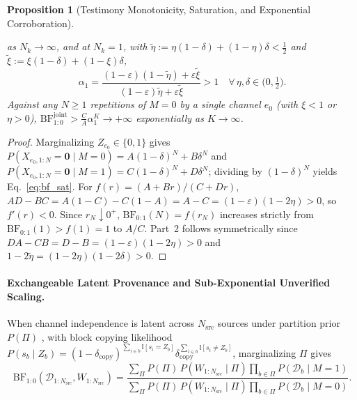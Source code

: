 \documentclass[11pt,a4paper]{article}
\newtheorem{proposition}{Proposition}
\theoremstyle{definition}
\theoremstyle{remark}
\newcommand{\BF}{\mathrm{BF}}
\begin{document}
\begin{proposition}[Testimony Monotonicity, Saturation, and Exponential Corroboration]
\begin{enumerate}[leftmargin=1.8em]
\begin{equation}
    \label{eq:alpha_inf}
  \end{equation}
  as $N_k \to \infty$, and at $N_k = 1$, with $\tilde{\eta} := \eta(1-\delta) + (1-\eta)\delta < \tfrac{1}{2}$ and $\tilde{\xi} := \xi(1-\delta) + (1-\xi)\delta$,
  \begin{equation}
    \alpha_1 = \frac{(1-\varepsilon)(1-\tilde{\eta}) + \varepsilon\tilde{\xi}}{(1-\varepsilon)\tilde{\eta} + \varepsilon\tilde{\xi}} > 1 \quad \forall\,\eta, \delta \in \bigl(0, \tfrac{1}{2}\bigr).
    \label{eq:alpha_one}
  \end{equation}
  Against any $N \ge 1$ repetitions of $M=0$ by a single channel $e_0$ (with $\xi < 1$ or $\eta > 0$), $\BF_{1:0}^{\mathrm{joint}} > \frac{C}{A} \alpha_1^K \to +\infty$ exponentially as $K \to \infty$.
\end{enumerate}
\end{proposition}

\begin{proof}
Marginalizing $Z_{e_0} \in \{0, 1\}$ gives $P(X_{e_0,1:N} = \mathbf{0} \mid M=0) = A(1-\delta)^N + B\delta^N$ and $P(X_{e_0,1:N} = \mathbf{0} \mid M=1) = C(1-\delta)^N + D\delta^N$; dividing by $(1-\delta)^N$ yields Eq.~\eqref{eq:bf_sat}. For $f(r) = (A + Br)/(C + Dr)$, $AD - BC = A(1-C) - C(1-A) = A - C = (1-\varepsilon)(1 - 2\eta) > 0$, so $f'(r) < 0$. Since $r_N \downarrow 0^+$, $\BF_{0:1}(N) = f(r_N)$ increases strictly from $\BF_{0:1}(1) > f(1) = 1$ to $A/C$. Part~2 follows symmetrically since $DA - CB = D - B = (1-\varepsilon)(1 - 2\eta) > 0$ and $1 - 2\tilde{\eta} = (1-2\eta)(1-2\delta) > 0$.
\end{proof}

\paragraph{Exchangeable Latent Provenance and Sub-Exponential Unverified Scaling.}
When channel independence is latent across $N_{\mathrm{src}}$ sources under partition prior $P(\Pi)$ \cite{dong2009integrating,aldous1985exchangeability,pitman2006combinatorial}, with block copying likelihood $P(s_b \mid Z_b) = (1 - \delta_{\mathrm{copy}})^{\sum_{i \in b} \mathbb{I}[s_i = Z_b]} \delta_{\mathrm{copy}}^{\sum_{i \in b} \mathbb{I}[s_i \ne Z_b]}$, marginalizing $\Pi$ gives
\begin{equation}
  \BF_{1:0}(\mathcal{D}_{1:N_{\mathrm{src}}}, W_{1:N_{\mathrm{src}}})
  = \frac{\sum_{\Pi} P(\Pi) \, P(W_{1:N_{\mathrm{src}}} \mid \Pi) \prod_{b \in \Pi} P(\mathcal{D}_b \mid M=1)}
         {\sum_{\Pi} P(\Pi) \, P(W_{1:N_{\mathrm{src}}} \mid \Pi) \prod_{b \in \Pi} P(\mathcal{D}_b \mid M=0)}.
  \label{eq:provenance_ratio}
\end{equation}
\end{document}
